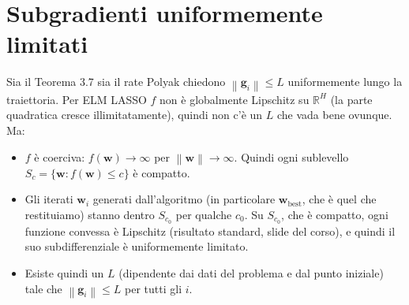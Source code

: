 \documentclass[11pt,a4paper]{article}
\newcommand{\R}{\mathbb{R}}
\newcommand{\norm}[1]{\left\|#1\right\|}
\newcommand{\bw}{\mathbf{w}}
\newcommand{\bg}{\mathbf{g}}
\theoremstyle{definition}
\begin{document}
\section{Subgradienti uniformemente limitati}

Sia il Teorema 3.7 sia il rate Polyak chiedono $\norm{\bg_i} \le L$ uniformemente lungo la traiettoria. Per ELM LASSO $f$ non è globalmente Lipschitz su $\R^H$ (la parte quadratica cresce illimitatamente), quindi non c'è un $L$ che vada bene ovunque. Ma:
\begin{itemize}[leftmargin=*]
\item $f$ è coerciva: $f(\bw) \to \infty$ per $\norm{\bw} \to \infty$. Quindi ogni sublevello $S_c = \{\bw : f(\bw)\le c\}$ è compatto.
\item Gli iterati $\bw_i$ generati dall'algoritmo (in particolare $\bw_{\mathrm{best}}$, che è quel che restituiamo) stanno dentro $S_{c_0}$ per qualche $c_0$. Su $S_{c_0}$, che è compatto, ogni funzione convessa è Lipschitz (risultato standard, slide del corso), e quindi il suo subdifferenziale è uniformemente limitato.
\item Esiste quindi un $L$ (dipendente dai dati del problema e dal punto iniziale) tale che $\norm{\bg_i} \le L$ per tutti gli $i$.
\end{itemize}
\end{document}
